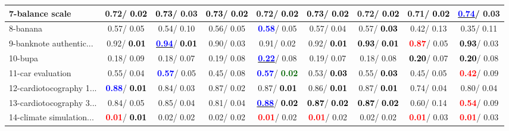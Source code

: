 \begin{table}[h]
\begin{center}
\begin{tabular}{lc|c|c|c|c|c|c|c}
7-balance scale &   0.72/\textcolor{black}{\textbf{  0.02}} & \textcolor{black}{\textbf{  0.73}}/  0.03 & \textcolor{black}{\textbf{  0.73}}/\textcolor{black}{\textbf{  0.02}} &   0.72/\textcolor{black}{\textbf{  0.02}} & \textcolor{black}{\textbf{  0.73}}/\textcolor{black}{\textbf{  0.02}} &   0.72/\textcolor{black}{\textbf{  0.02}} &   0.71/\textcolor{black}{\textbf{  0.02}} & \underline{\textcolor{blue}{\textbf{  0.74}}}/  0.03 \\ \hline
8-banana &   0.57/  0.05 &   0.54/  0.10 &   0.56/  0.05 & \textcolor{blue}{\textbf{  0.58}}/  0.05 &   0.57/  0.04 &   0.57/\textcolor{black}{\textbf{  0.03}} &   0.42/  0.13 &   0.35/  0.11 \\
9-banknote authentic... &   0.92/\textcolor{black}{\textbf{  0.01}} & \underline{\textcolor{blue}{\textbf{  0.94}}}/\textcolor{black}{\textbf{  0.01}} &   0.90/  0.03 &   0.91/  0.02 &   0.92/\textcolor{black}{\textbf{  0.01}} & \textcolor{black}{\textbf{  0.93}}/\textcolor{black}{\textbf{  0.01}} & \textcolor{red}{\textbf{  0.87}}/  0.05 & \textcolor{black}{\textbf{  0.93}}/  0.03 \\
10-bupa &   0.18/  0.09 &   0.18/  0.07 &   0.19/  0.08 & \underline{\textcolor{blue}{\textbf{  0.22}}}/  0.08 &   0.19/  0.07 &   0.18/  0.08 & \textcolor{black}{\textbf{  0.20}}/  0.07 & \textcolor{black}{\textbf{  0.20}}/  0.08 \\
11-car evaluation &   0.55/  0.04 & \textcolor{blue}{\textbf{  0.57}}/  0.05 &   0.45/  0.08 & \textcolor{blue}{\textbf{  0.57}}/\textcolor{darkgreen}{\textbf{  0.02}} &   0.53/\textcolor{black}{\textbf{  0.03}} &   0.55/\textcolor{black}{\textbf{  0.03}} &   0.45/  0.05 & \textcolor{red}{\textbf{  0.42}}/  0.09 \\
12-cardiotocography 1... & \textcolor{blue}{\textbf{  0.88}}/\textcolor{black}{\textbf{  0.01}} &   0.84/  0.03 &   0.87/  0.02 &   0.87/\textcolor{black}{\textbf{  0.01}} &   0.86/\textcolor{black}{\textbf{  0.01}} &   0.87/\textcolor{black}{\textbf{  0.01}} &   0.74/  0.04 &   0.80/  0.04 \\
13-cardiotocography 3... &   0.84/  0.05 &   0.85/  0.04 &   0.81/  0.04 & \underline{\textcolor{blue}{\textbf{  0.88}}}/\textcolor{black}{\textbf{  0.02}} & \textcolor{black}{\textbf{  0.87}}/\textcolor{black}{\textbf{  0.02}} & \textcolor{black}{\textbf{  0.87}}/\textcolor{black}{\textbf{  0.02}} &   0.60/  0.14 & \textcolor{red}{\textbf{  0.54}}/  0.09 \\
14-climate simulation... & \textcolor{red}{\textbf{  0.01}}/\textcolor{black}{\textbf{  0.01}} &   0.02/  0.02 &   0.02/  0.02 & \textcolor{red}{\textbf{  0.01}}/  0.02 & \textcolor{red}{\textbf{  0.01}}/  0.02 &   0.02/  0.02 & \textcolor{red}{\textbf{  0.01}}/  0.03 & \textcolor{red}{\textbf{  0.01}}/  0.03 \\ \hline

\end{tabular}
\end{center}
\end{table}
